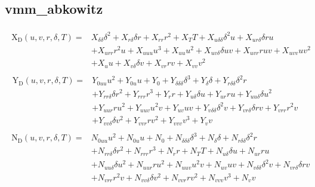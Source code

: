 \documentclass[review]{elsarticle}
\begin{document}
\subsection{vmm\_abkowitz}
\label{\detokenize{appendix_vmms:vmm-abkowitz}}\begin{equation}\label{equation:appendix_vmms:eq_X_D_vmm_abkowitz}
\begin{split}
\begin{align*}
\operatorname{X_{D}}{\left(u,v,r,\delta,T \right)} = & X_{\delta\delta} \delta^{2} + X_{r\delta} \delta r + X_{rr} r^{2} + X_{T} T + X_{u\delta\delta} \delta^{2} u + X_{ur\delta} \delta r u \\
& + X_{urr} r^{2} u + X_{uuu} u^{3} + X_{uu} u^{2} + X_{uv\delta} \delta u v + X_{uvr} r u v + X_{uvv} u v^{2} \\
& + X_{u} u + X_{v\delta} \delta v + X_{vr} r v + X_{vv} v^{2} 
\end{align*}
\end{split}
\end{equation}\begin{equation}\label{equation:appendix_vmms:eq_Y_D_vmm_abkowitz}
\begin{split}
\begin{align*}
\operatorname{Y_{D}}{\left(u,v,r,\delta,T \right)} = & Y_{0uu} u^{2} + Y_{0u} u + Y_{0} + Y_{\delta\delta\delta} \delta^{3} + Y_{\delta} \delta + Y_{r\delta\delta} \delta^{2} r \\
& + Y_{rr\delta} \delta r^{2} + Y_{rrr} r^{3} + Y_{r} r + Y_{u\delta} \delta u + Y_{ur} r u + Y_{uu\delta} \delta u^{2} \\
& + Y_{uur} r u^{2} + Y_{uuv} u^{2} v + Y_{uv} u v + Y_{v\delta\delta} \delta^{2} v + Y_{vr\delta} \delta r v + Y_{vrr} r^{2} v \\
& + Y_{vv\delta} \delta v^{2} + Y_{vvr} r v^{2} + Y_{vvv} v^{3} + Y_{v} v 
\end{align*}
\end{split}
\end{equation}\begin{equation}\label{equation:appendix_vmms:eq_N_D_vmm_abkowitz}
\begin{split}
\begin{align*}
\operatorname{N_{D}}{\left(u,v,r,\delta,T \right)} = & N_{0uu} u^{2} + N_{0u} u + N_{0} + N_{\delta\delta\delta} \delta^{3} + N_{\delta} \delta + N_{r\delta\delta} \delta^{2} r \\
& + N_{rr\delta} \delta r^{2} + N_{rrr} r^{3} + N_{r} r + N_{T} T + N_{u\delta} \delta u + N_{ur} r u \\
& + N_{uu\delta} \delta u^{2} + N_{uur} r u^{2} + N_{uuv} u^{2} v + N_{uv} u v + N_{v\delta\delta} \delta^{2} v + N_{vr\delta} \delta r v \\
& + N_{vrr} r^{2} v + N_{vv\delta} \delta v^{2} + N_{vvr} r v^{2} + N_{vvv} v^{3} + N_{v} v 
\end{align*}
\end{split}
\end{equation}
\end{document}
